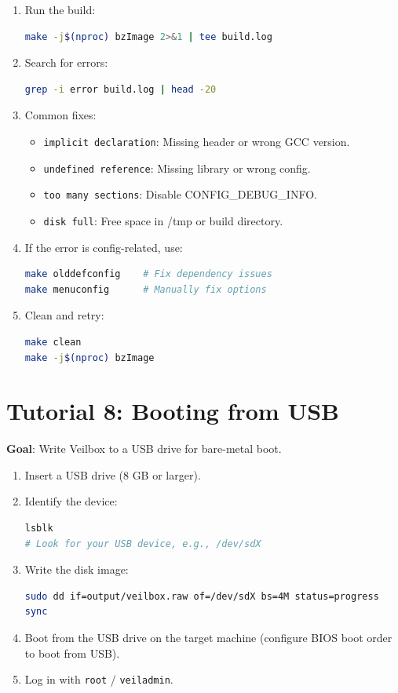 \begin{enumerate}[nosep]
  \item Run the build:
\begin{lstlisting}[language=bash]
make -j$(nproc) bzImage 2>&1 | tee build.log
\end{lstlisting}
  \item Search for errors:
\begin{lstlisting}[language=bash]
grep -i error build.log | head -20
\end{lstlisting}
  \item Common fixes:
\begin{itemize}[nosep]
  \item \texttt{implicit declaration}: Missing header or wrong GCC version.
  \item \texttt{undefined reference}: Missing library or wrong config.
  \item \texttt{too many sections}: Disable CONFIG\_DEBUG\_INFO.
  \item \texttt{disk full}: Free space in /tmp or build directory.
\end{itemize}
  \item If the error is config-related, use:
\begin{lstlisting}[language=bash]
make olddefconfig    # Fix dependency issues
make menuconfig      # Manually fix options
\end{lstlisting}
  \item Clean and retry:
\begin{lstlisting}[language=bash]
make clean
make -j$(nproc) bzImage
\end{lstlisting}
\end{enumerate}

\section{Tutorial 8: Booting from USB}

\textbf{Goal}: Write Veilbox to a USB drive for bare-metal boot.

\begin{enumerate}[nosep]
  \item Insert a USB drive (8 GB or larger).
  \item Identify the device:
\begin{lstlisting}[language=bash]
lsblk
# Look for your USB device, e.g., /dev/sdX
\end{lstlisting}
  \item Write the disk image:
\begin{lstlisting}[language=bash]
sudo dd if=output/veilbox.raw of=/dev/sdX bs=4M status=progress
sync
\end{lstlisting}
  \item Boot from the USB drive on the target machine (configure BIOS
        boot order to boot from USB).
  \item Log in with \texttt{root} / \texttt{veiladmin}.
\end{enumerate}

